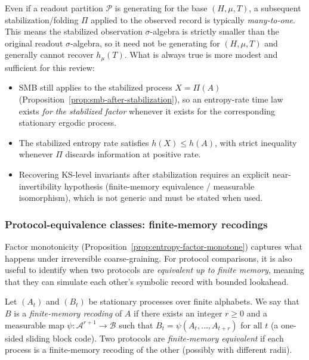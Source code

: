 \begin{remark}\label{rem:loss-of-generator}
Even if a readout partition \(\mathcal{P}\) is generating for the base \((H,\mu,T)\), a subsequent stabilization/folding \(\Pi\) applied to the observed record is typically \emph{many-to-one}. This means the stabilized observation \(\sigma\)-algebra is strictly smaller than the original readout \(\sigma\)-algebra, so it need not be generating for \((H,\mu,T)\) and generally cannot recover \(h_\mu(T)\).
What is always true is more modest and sufficient for this review:
\begin{itemize}[leftmargin=*,itemsep=2pt]
  \item SMB still applies to the stabilized process \(X=\Pi(A)\) (Proposition~\ref{prop:smb-after-stabilization}), so an entropy-rate time law exists \emph{for the stabilized factor} whenever it exists for the corresponding stationary ergodic process.
  \item The stabilized entropy rate satisfies \(h(X)\le h(A)\), with strict inequality whenever \(\Pi\) discards information at positive rate.
  \item Recovering KS-level invariants after stabilization requires an explicit near-invertibility hypothesis (finite-memory equivalence / measurable isomorphism), which is not generic and must be stated when used.
\end{itemize}
\end{remark}

\subsubsection{Protocol-equivalence classes: finite-memory recodings}\label{sec:info-time:equivalence}

Factor monotonicity (Proposition~\ref{prop:entropy-factor-monotone}) captures what happens under irreversible coarse-graining. For protocol comparisons, it is also useful to identify when two protocols are \emph{equivalent up to finite memory}, meaning that they can simulate each other's symbolic record with bounded lookahead.

\begin{definition}\label{def:finite-memory-equivalence}
Let $(A_t)$ and $(B_t)$ be stationary processes over finite alphabets. We say that $B$ is a \emph{finite-memory recoding} of $A$ if there exists an integer $r\ge 0$ and a measurable map $\psi:\mathcal{A}^{r+1}\to\mathcal{B}$ such that $B_t=\psi(A_t,\dots,A_{t+r})$ for all $t$ (a one-sided sliding block code). Two protocols are \emph{finite-memory equivalent} if each process is a finite-memory recoding of the other (possibly with different radii).
\end{definition}

